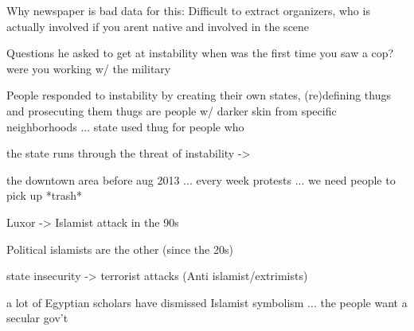 Why newspaper is bad data for this: 
    Difficult to extract organizers, who is actually involved if you arent native and involved in the scene

Questions he asked to get at instability
		when was the first time you saw a cop?
		were you working w/ the military



People responded to instability by creating their own states, (re)defining thugs and prosecuting them
    thugs are people w/ darker skin from specific neighborhoods ... state used thug for people who 

the state runs through the threat of instability -> 	
    
		the downtown area before aug 2013 ... every week protests ...  we need people to pick up *trash*

		Luxor -> Islamist attack in the 90s

		Political islamists are the other  (since the 20s)

		state insecurity -> terrorist attacks (Anti islamist/extrimists)	

a lot of Egyptian scholars have dismissed Islamist symbolism  ... the people want a secular gov't


